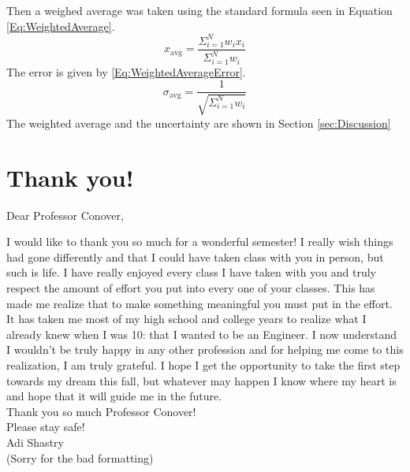 \documentclass[%
 aps,%
 pra,%
 preprint, %
 amsmath, %
 amsfonts, %
 amssymb, %
]{revtex4-2}
\begin{document}
Then a weighed average was taken using the standard formula seen in Equation \ref{Eq:WeightedAverage}\cite{Taylor1997}.
\begin{equation}
    \label{Eq:WeightedAverage}
    x_{\text{avg}}=\frac{\Sigma_{i=1}^N w_i x_i}{\Sigma_{i=1}^N w_i}
\end{equation}{}
The error is given by \ref{Eq:WeightedAverageError}\cite{Taylor1997}.
\begin{equation}
    \label{Eq:WeightedAverageError}
    \sigma_{\text{avg}}=\frac{1}{\sqrt{\Sigma_{i=1}^N w_i}}
\end{equation}{}
The weighted average and the uncertainty are shown in Section \ref{sec:Discussion}



\section{Thank you!}
Dear Professor Conover, 

I would like to thank you so much for a wonderful semester! I really wish things had gone differently and that I could have taken class with you in person, but such is life. I have really enjoyed every class I have taken with you and truly respect the amount of effort you put into every one of your classes. This has made me realize that to make something meaningful you must put in the effort. It has taken me most of my high school and college years to realize what I already knew when I was 10: that I wanted to be an Engineer. I now understand I wouldn't be truly happy in any other profession and for helping me come to this realization, I am truly grateful. I hope I get the opportunity to take the first step towards my dream this fall, but whatever may happen I know where my heart is and hope that it will guide me in the future.
\vspace{10mm}\\
Thank you so much Professor Conover!\\
Please stay safe!\\
Adi Shastry\\
(Sorry for the bad formatting)



 
\end{document}
